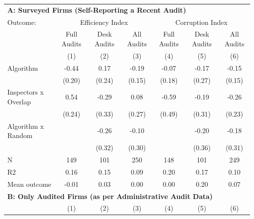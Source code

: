 \begin{tabular}{lccc|ccc} \toprule
\multicolumn{7}{l}{\textbf{A: Surveyed Firms (Self-Reporting a Recent Audit)}} \\ \multicolumn{1}{l}{Outcome:} & \multicolumn{3}{c}{Efficiency Index} & \multicolumn{3}{c}{Corruption Index} \\ \multicolumn{1}{l}{} & Full Audits & Desk Audits & All Audits & Full Audits & Desk Audits & All Audits \\ \multicolumn{1}{l}{} & (1) & (2) & (3) & (4) & (5) & (6) \\ \midrule
Algorithm   &       -0.44\sym{**} &        0.17         &       -0.19         &       -0.07         &       -0.17         &       -0.15         \\
            &      (0.20)         &      (0.24)         &      (0.15)         &      (0.18)         &      (0.27)         &      (0.15)         \\
\addlinespace
Inspectors x Overlap&        0.54\sym{**} &       -0.29         &        0.08         &       -0.59         &       -0.19         &       -0.26         \\
            &      (0.24)         &      (0.33)         &      (0.27)         &      (0.49)         &      (0.31)         &      (0.23)         \\
\addlinespace
Algorithm x Random&                     &       -0.26         &       -0.10         &                     &       -0.20         &       -0.18         \\
            &                     &      (0.32)         &      (0.30)         &                     &      (0.36)         &      (0.31)         \\
\midrule
N           &         149         &         101         &         250         &         148         &         101         &         249         \\
R2          &        0.16         &        0.15         &        0.09         &        0.20         &        0.17         &        0.10         \\
Mean outcome&       -0.01         &        0.03         &        0.00         &        0.00         &        0.20         &        0.07         \\

\midrule \multicolumn{7}{l}{\textbf{B: Only Audited Firms (as per Administrative Audit Data)}} \\ \multicolumn{1}{l}{} & (1) & (2) & (3) & (4) & (5) & (6) \\ \midrule


\end{tabular}
